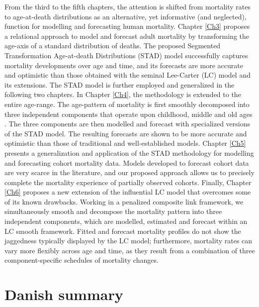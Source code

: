 \documentclass[Thesis]{subfiles}
\begin{document}
From the third to the fifth chapters, the attention is shifted from mortality rates to age-at-death distributions as an alternative, yet informative (and neglected), function for modelling and forecasting human mortality. Chapter \ref{Ch3} proposes a relational approach to model and forecast adult mortality by transforming the age-axis of a standard distribution of deaths. The proposed Segmented Transformation Age-at-death Distributions (STAD) model successfully captures mortality developments over age and time, and its forecasts are more accurate and optimistic than those obtained with the seminal Lee-Carter (LC) model \citep{lee1992modeling} and its extensions. The STAD model is further employed and generalized in the following two chapters. In Chapter \ref{Ch4}, the methodology is extended to the entire age-range. The age-pattern of mortality is first smoothly decomposed into three independent components that operate upon childhood, middle and old ages \cite[as originally proposed by][]{thiele1871mathematical}. The three components are then modelled and forecast with specialized versions of the STAD model. The resulting forecasts are shown to be more accurate and optimistic than those of traditional and well-established models. Chapter \ref{Ch5} presents a generalization and application of the STAD methodology for modelling and forecasting cohort mortality data. Models developed to forecast cohort data are very scarce in the literature, and our proposed approach allows us to precisely complete the mortality experience of partially observed cohorts. Finally, Chapter \ref{Ch6} proposes a new extension of the influential LC model that overcomes some of its known drawbacks.  Working in a penalized composite link framework, we simultaneously smooth and decompose the mortality pattern into three independent components, which are modelled, estimated and forecast within an LC smooth framework. Fitted and forecast mortality profiles do not show the jaggedness typically displayed by the LC model; furthermore, mortality rates can vary more flexibly across age and time, as they result from a combination of three component-specific schedules of mortality changes.

\chapter*{Danish summary}
\vspace{-0.5cm}
\end{document}
